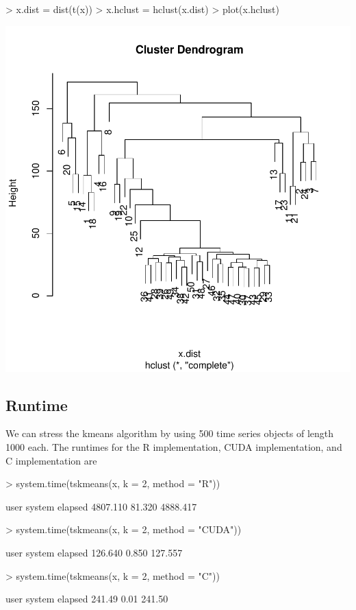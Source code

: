 \documentclass{article}
\begin{document}
\begin{Schunk}
\begin{Sinput}
> x.dist = dist(t(x))
> x.hclust = hclust(x.dist)
> plot(x.hclust)
\end{Sinput}
\end{Schunk}
\includegraphics{tsclust-012}

\subsection{Runtime}

We can stress the kmeans algorithm by using 500 time series objects of length 1000 each.
The runtimes for the R implementation, CUDA implementation, and C implementation are

\begin{Schunk}
\begin{Sinput}
> system.time(tskmeans(x, k = 2, method = "R"))
\end{Sinput}
\begin{Soutput}
    user   system  elapsed 
4807.110   81.320 4888.417 
\end{Soutput}
\begin{Sinput}
> system.time(tskmeans(x, k = 2, method = "CUDA"))
\end{Sinput}
\begin{Soutput}
   user  system elapsed 
126.640   0.850 127.557 
\end{Soutput}
\begin{Sinput}
> system.time(tskmeans(x, k = 2, method = "C"))
\end{Sinput}
\begin{Soutput}
   user  system elapsed 
 241.49    0.01  241.50 
\end{Soutput}
\end{Schunk}
\end{document}
